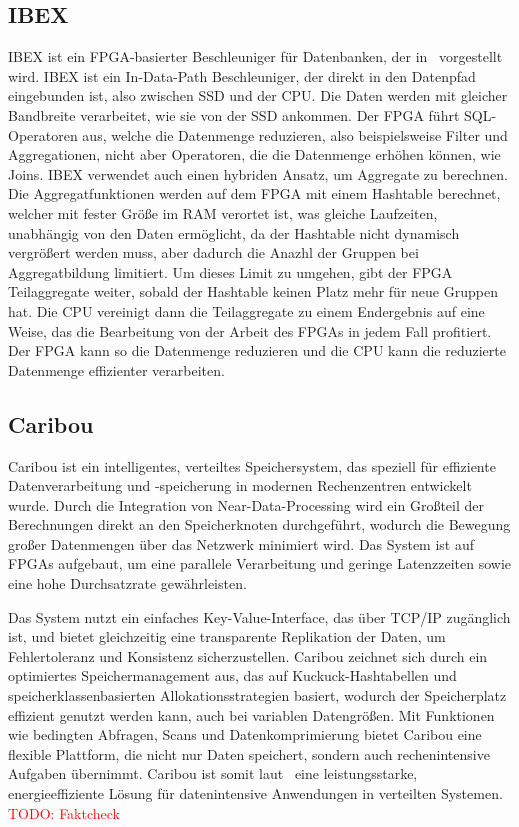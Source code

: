 \documentclass[conference]{IEEEtran}
\newcommand{\todo}[1]{\textcolor{red}{TODO: #1}}
\begin{document}
\subsection{IBEX}
IBEX ist ein FPGA-basierter Beschleuniger für Datenbanken, der in~\cite{istvan_glass_2019} vorgestellt wird. IBEX ist ein In-Data-Path Beschleuniger,
der direkt in den Datenpfad eingebunden ist, also zwischen SSD und der CPU\@. Die Daten werden mit gleicher Bandbreite verarbeitet, wie sie von der SSD
ankommen. Der FPGA führt SQL-Operatoren aus, welche die Datenmenge reduzieren, also beispielsweise Filter und Aggregationen, nicht aber Operatoren,
die die Datenmenge erhöhen können, wie Joins. IBEX verwendet auch einen hybriden Ansatz, um Aggregate zu berechnen. Die Aggregatfunktionen werden auf dem FPGA
mit einem Hashtable berechnet, welcher mit fester Größe im RAM verortet ist, was gleiche Laufzeiten, unabhängig von den Daten ermöglicht, da der Hashtable nicht
dynamisch vergrößert werden muss, aber dadurch die Anazhl der Gruppen bei Aggregatbildung limitiert. Um dieses Limit zu umgehen, gibt der FPGA Teilaggregate
weiter, sobald der Hashtable keinen Platz mehr für neue Gruppen hat. Die CPU vereinigt dann die Teilaggregate zu einem Endergebnis auf eine Weise, das die Bearbeitung
von der Arbeit des FPGAs in jedem Fall profitiert. Der FPGA kann so die Datenmenge reduzieren und die CPU kann die reduzierte Datenmenge effizienter verarbeiten.

\subsection{Caribou}
Caribou ist ein intelligentes, verteiltes Speichersystem, das speziell für effiziente Datenverarbeitung und -speicherung in modernen Rechenzentren entwickelt wurde.
Durch die Integration von Near-Data-Processing wird ein Großteil der Berechnungen direkt an den Speicherknoten durchgeführt, wodurch die Bewegung großer Datenmengen
über das Netzwerk minimiert wird. Das System ist auf FPGAs aufgebaut, um eine parallele Verarbeitung und geringe
Latenzzeiten sowie eine hohe Durchsatzrate gewährleisten.

Das System nutzt ein einfaches Key-Value-Interface, das über TCP/IP zugänglich ist, und bietet gleichzeitig eine transparente Replikation der Daten, um Fehlertoleranz
und Konsistenz sicherzustellen. Caribou zeichnet sich durch ein optimiertes Speichermanagement aus, das auf Kuckuck-Hashtabellen und speicherklassenbasierten
Allokationsstrategien basiert, wodurch der Speicherplatz effizient genutzt werden kann, auch bei variablen Datengrößen. Mit Funktionen wie bedingten Abfragen, Scans und
Datenkomprimierung bietet Caribou eine flexible Plattform, die nicht nur Daten speichert, sondern auch rechenintensive Aufgaben übernimmt. Caribou ist somit laut~\cite{istvan_caribou_2017}
eine leistungsstarke, energieeffiziente Lösung für datenintensive Anwendungen in verteilten Systemen. \todo{Faktcheck}
\end{document}
